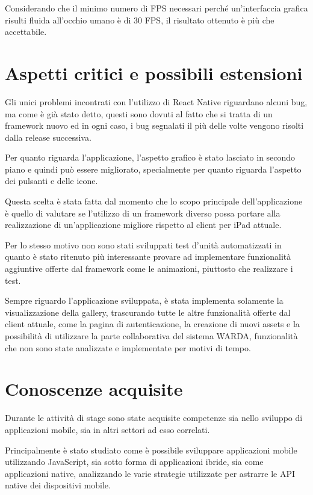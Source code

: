 Considerando che il minimo numero di FPS necessari perché un'interfaccia grafica risulti fluida all'occhio umano è di 30 FPS, il risultato ottenuto è più che accettabile.

\section{Aspetti critici e possibili estensioni}

Gli unici problemi incontrati con l'utilizzo di React Native riguardano alcuni bug, ma come è già stato detto, questi sono dovuti al fatto che si tratta di un framework nuovo ed in ogni caso, i bug segnalati il più delle volte vengono risolti dalla release successiva.

Per quanto riguarda l'applicazione, l'aspetto grafico è stato lasciato in secondo piano e quindi può essere migliorato, specialmente per quanto riguarda l'aspetto dei pulsanti e delle icone.

Questa scelta è stata fatta dal momento che lo scopo principale dell'applicazione è quello di valutare se l'utilizzo di un framework diverso possa portare alla realizzazione di un'applicazione migliore rispetto al client per iPad attuale.

Per lo stesso motivo non sono stati sviluppati test d'unità automatizzati in quanto è stato ritenuto più interessante provare ad implementare funzionalità aggiuntive offerte dal framework come le animazioni, piuttosto che realizzare i test.

Sempre riguardo l'applicazione sviluppata, è stata implementa solamente la visualizzazione della gallery, trascurando tutte le altre funzionalità offerte dal client attuale, come la pagina di autenticazione, la creazione di nuovi assets e la possibilità di utilizzare la parte collaborativa del sistema WARDA, funzionalità che non sono state analizzate e implementate per motivi di tempo.

\section{Conoscenze acquisite}

Durante le attività di stage sono state acquisite competenze sia nello sviluppo di applicazioni mobile, sia in altri settori ad esso correlati.

Principalmente è stato studiato come è possibile sviluppare applicazioni mobile utilizzando JavaScript, sia sotto forma di applicazioni ibride, sia come applicazioni native, analizzando le varie strategie utilizzate per astrarre le API native dei dispositivi mobile.

